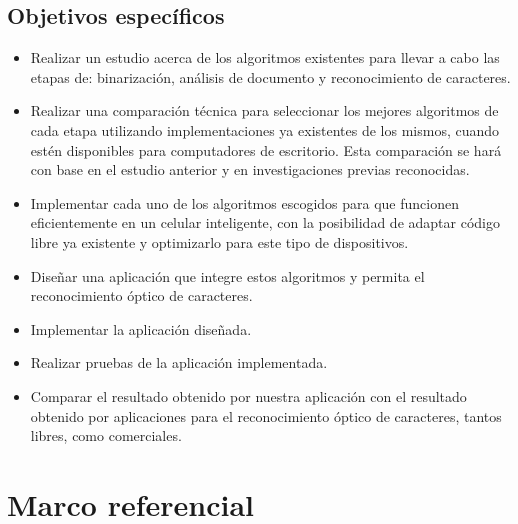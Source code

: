\documentclass[a4paper, 11pt, oneside]{article}
\begin{document}
	\subsection{Objetivos específicos}
	\begin{itemize}
	\item Realizar un estudio acerca de los algoritmos existentes para llevar a cabo las etapas de: binarización, análisis de documento y reconocimiento de caracteres.
	\item Realizar una comparación técnica para seleccionar los mejores algoritmos de cada etapa utilizando implementaciones ya existentes de los mismos, cuando estén disponibles para computadores de escritorio. Esta comparación se hará con base en el estudio anterior y en investigaciones previas reconocidas.
	\item Implementar cada uno de los algoritmos escogidos para que funcionen eficientemente en un celular inteligente, con la posibilidad de adaptar código libre ya existente y optimizarlo para este tipo de dispositivos.
	\item Diseñar una aplicación que integre estos algoritmos y permita el reconocimiento óptico de caracteres.
	\item Implementar la aplicación diseñada.
	\item Realizar pruebas de la aplicación implementada.
	\item Comparar el resultado obtenido por nuestra aplicación con el resultado obtenido por aplicaciones para el reconocimiento óptico de caracteres, tantos libres, como comerciales.
	\end{itemize}
	\clearpage
	
	\section{Marco referencial}
	
\end{document}
